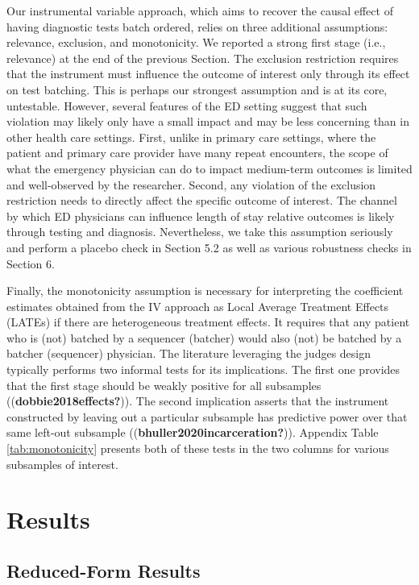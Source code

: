\documentclass{article}
\begin{document}
Our instrumental variable approach, which aims to recover the causal
effect of having diagnostic tests batch ordered, relies on three
additional assumptions: relevance, exclusion, and monotonicity. We
reported a strong first stage (i.e., relevance) at the end of the
previous Section. The exclusion restriction requires that the instrument
must influence the outcome of interest only through its effect on test
batching. This is perhaps our strongest assumption and is at its core,
untestable. However, several features of the ED setting suggest that
such violation may likely only have a small impact and may be less
concerning than in other health care settings. First, unlike in primary
care settings, where the patient and primary care provider have many
repeat encounters, the scope of what the emergency physician can do to
impact medium-term outcomes is limited and well-observed by the
researcher. Second, any violation of the exclusion restriction needs to
directly affect the specific outcome of interest. The channel by which
ED physicians can influence length of stay relative outcomes is likely
through testing and diagnosis. Nevertheless, we take this assumption
seriously and perform a placebo check in Section 5.2 as well as various
robustness checks in Section 6.

Finally, the monotonicity assumption is necessary for interpreting the
coefficient estimates obtained from the IV approach as Local Average
Treatment Effects (LATEs) if there are heterogeneous treatment effects.
It requires that any patient who is (not) batched by a sequencer
(batcher) would also (not) be batched by a batcher (sequencer)
physician. The literature leveraging the judges design typically
performs two informal tests for its implications. The first one provides
that the first stage should be weakly positive for all subsamples
((\textbf{dobbie2018effects?})). The second implication asserts that the
instrument constructed by leaving out a particular subsample has
predictive power over that same left-out subsample
((\textbf{bhuller2020incarceration?})). Appendix Table
\ref{tab:monotonicity} presents both of these tests in the two columns
for various subsamples of interest.

\hypertarget{sec:4}{%
\section{Results}\label{sec:4}}

\hypertarget{reduced-form-results}{%
\subsection{Reduced-Form Results}\label{reduced-form-results}}
\end{document}
